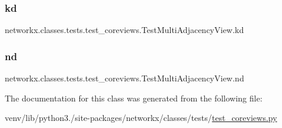 \subsubsection{\texorpdfstring{kd}{kd}}
{\footnotesize\ttfamily networkx.\+classes.\+tests.\+test\+\_\+coreviews.\+Test\+Multi\+Adjacency\+View.\+kd}

\mbox{\label{classnetworkx_1_1classes_1_1tests_1_1test__coreviews_1_1TestMultiAdjacencyView_a486c6bac32999e9b66327b01b0e26914}} 
\subsubsection{\texorpdfstring{nd}{nd}}
{\footnotesize\ttfamily networkx.\+classes.\+tests.\+test\+\_\+coreviews.\+Test\+Multi\+Adjacency\+View.\+nd}



The documentation for this class was generated from the following file\+:\begin{DoxyCompactItemize}
\item 
venv/lib/python3./site-\/packages/networkx/classes/tests/\hyperlink{test__coreviews_8py}{test\+\_\+coreviews.\+py}\end{DoxyCompactItemize}
